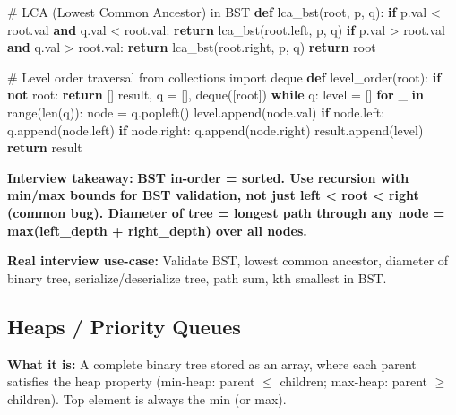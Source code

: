 \documentclass[11pt]{article}
\newenvironment{Shaded}{\begin{snugshade}}{\end{snugshade}}
\newcommand{\BuiltInTok}[1]{\textcolor[rgb]{0.50,0.55,0.55}{#1}}
\newcommand{\CommentTok}[1]{\textcolor[rgb]{0.48,0.49,0.49}{#1}}
\newcommand{\ControlFlowTok}[1]{\textcolor[rgb]{0.99,0.74,0.29}{\textbf{#1}}}
\newcommand{\ImportTok}[1]{\textcolor[rgb]{0.15,0.68,0.38}{#1}}
\newcommand{\KeywordTok}[1]{\textcolor[rgb]{0.81,0.81,0.76}{\textbf{#1}}}
\newcommand{\NormalTok}[1]{\textcolor[rgb]{0.81,0.81,0.76}{#1}}
\newcommand{\OperatorTok}[1]{\textcolor[rgb]{0.81,0.81,0.76}{#1}}
\begin{document}
\begin{Shaded}
\begin{Highlighting}[]
\CommentTok{\# LCA (Lowest Common Ancestor) in BST}
\KeywordTok{def}\NormalTok{ lca\_bst(root, p, q):}
    \ControlFlowTok{if}\NormalTok{ p.val }\OperatorTok{\textless{}}\NormalTok{ root.val }\KeywordTok{and}\NormalTok{ q.val }\OperatorTok{\textless{}}\NormalTok{ root.val:}
        \ControlFlowTok{return}\NormalTok{ lca\_bst(root.left, p, q)}
    \ControlFlowTok{if}\NormalTok{ p.val }\OperatorTok{\textgreater{}}\NormalTok{ root.val }\KeywordTok{and}\NormalTok{ q.val }\OperatorTok{\textgreater{}}\NormalTok{ root.val:}
        \ControlFlowTok{return}\NormalTok{ lca\_bst(root.right, p, q)}
    \ControlFlowTok{return}\NormalTok{ root}

\CommentTok{\# Level order traversal}
\ImportTok{from}\NormalTok{ collections }\ImportTok{import}\NormalTok{ deque}
\KeywordTok{def}\NormalTok{ level\_order(root):}
    \ControlFlowTok{if} \KeywordTok{not}\NormalTok{ root: }\ControlFlowTok{return}\NormalTok{ []}
\NormalTok{    result, q }\OperatorTok{=}\NormalTok{ [], deque([root])}
    \ControlFlowTok{while}\NormalTok{ q:}
\NormalTok{        level }\OperatorTok{=}\NormalTok{ []}
        \ControlFlowTok{for}\NormalTok{ \_ }\KeywordTok{in} \BuiltInTok{range}\NormalTok{(}\BuiltInTok{len}\NormalTok{(q)):}
\NormalTok{            node }\OperatorTok{=}\NormalTok{ q.popleft()}
\NormalTok{            level.append(node.val)}
            \ControlFlowTok{if}\NormalTok{ node.left: q.append(node.left)}
            \ControlFlowTok{if}\NormalTok{ node.right: q.append(node.right)}
\NormalTok{        result.append(level)}
    \ControlFlowTok{return}\NormalTok{ result}
\end{Highlighting}
\end{Shaded}

\textbf{Interview takeaway:} \textbf{BST in-order = sorted. Use recursion with min/max bounds for BST validation, not just left \textless{} root \textless{} right (common bug). Diameter of tree = longest path through any node = max(left\_depth + right\_depth) over all nodes.}

\textbf{Real interview use-case:} Validate BST, lowest common ancestor, diameter of binary tree, serialize/deserialize tree, path sum, kth smallest in BST.

\subsection{Heaps / Priority Queues}\label{heaps--priority-queues}

\textbf{What it is:} A complete binary tree stored as an array, where each parent satisfies the heap property (min-heap: parent \(\leq\) children; max-heap: parent \(\geq\) children). Top element is always the min (or max).
\end{document}
